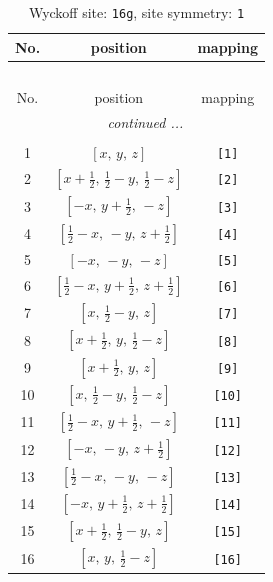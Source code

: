 \documentclass[fleqn,8pt]{jsarticle}
\begin{document}
\begin{longtable}{ccc}
\caption{Wyckoff site: {\tt 16g}, site symmetry: {\tt 1}}
 \\
 \hline \hline
No. & position & mapping \\ \hline \endfirsthead

\multicolumn{2}{l}{\tablename\ \thetable{}} \\
 \hline \hline
No. & position & mapping \\ \hline \endhead

 \hline \hline
\multicolumn{2}{r}{\footnotesize\it continued ...} \\ \endfoot

 \hline \hline
\multicolumn{2}{r}{} \\ \endlastfoot

1 & $\left[ x,\, y,\, z \right]$ & {\tt [1]} \\ \hline
2 & $\left[ x + \frac{1}{2},\, \frac{1}{2} - y,\, \frac{1}{2} - z \right]$ & {\tt [2]} \\ \hline
3 & $\left[ - x,\, y + \frac{1}{2},\, - z \right]$ & {\tt [3]} \\ \hline
4 & $\left[ \frac{1}{2} - x,\, - y,\, z + \frac{1}{2} \right]$ & {\tt [4]} \\ \hline
5 & $\left[ - x,\, - y,\, - z \right]$ & {\tt [5]} \\ \hline
6 & $\left[ \frac{1}{2} - x,\, y + \frac{1}{2},\, z + \frac{1}{2} \right]$ & {\tt [6]} \\ \hline
7 & $\left[ x,\, \frac{1}{2} - y,\, z \right]$ & {\tt [7]} \\ \hline
8 & $\left[ x + \frac{1}{2},\, y,\, \frac{1}{2} - z \right]$ & {\tt [8]} \\ \hline
9 & $\left[ x + \frac{1}{2},\, y,\, z \right]$ & {\tt [9]} \\ \hline
10 & $\left[ x,\, \frac{1}{2} - y,\, \frac{1}{2} - z \right]$ & {\tt [10]} \\ \hline
11 & $\left[ \frac{1}{2} - x,\, y + \frac{1}{2},\, - z \right]$ & {\tt [11]} \\ \hline
12 & $\left[ - x,\, - y,\, z + \frac{1}{2} \right]$ & {\tt [12]} \\ \hline
13 & $\left[ \frac{1}{2} - x,\, - y,\, - z \right]$ & {\tt [13]} \\ \hline
14 & $\left[ - x,\, y + \frac{1}{2},\, z + \frac{1}{2} \right]$ & {\tt [14]} \\ \hline
15 & $\left[ x + \frac{1}{2},\, \frac{1}{2} - y,\, z \right]$ & {\tt [15]} \\ \hline
16 & $\left[ x,\, y,\, \frac{1}{2} - z \right]$ & {\tt [16]} \\
\end{longtable}
\end{document}
